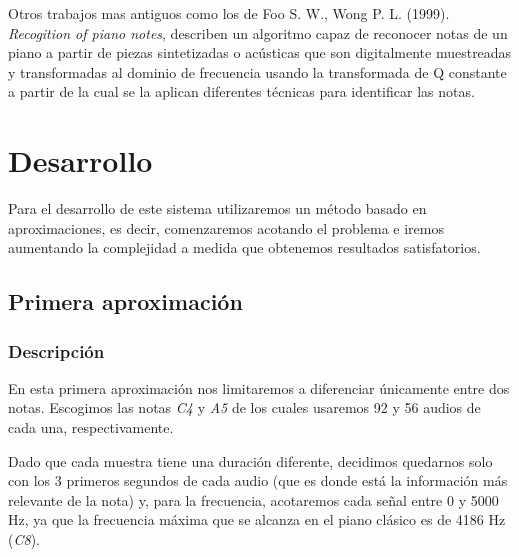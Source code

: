 \documentclass[12pt]{article}
\begin{document}
\bigskip
Otros trabajos mas antiguos como los de Foo S. W., Wong P. L. (1999). \textit{Recogition of piano notes}, describen un algoritmo capaz de reconocer notas
de un piano a partir de piezas sintetizadas o acústicas que son digitalmente muestreadas y transformadas al dominio de frecuencia usando 
la transformada de Q constante a partir de la cual se la aplican diferentes técnicas para identificar las notas.

\newpage
\section{Desarrollo}
\label{Desarrollo}
Para el desarrollo de este sistema utilizaremos un método basado en aproximaciones, es decir, comenzaremos acotando el problema e iremos aumentando
la complejidad a medida que obtenemos resultados satisfatorios.
\subsection{Primera aproximación}
\label{Primera aproximación}

\subsubsection{Descripción}
En esta primera aproximación nos limitaremos a diferenciar únicamente entre dos notas. 
Escogimos las notas \textit{C4} y \textit{A5} de los cuales usaremos 92 y 56 audios de cada una, respectivamente.

\bigskip
Dado que cada muestra tiene una duración diferente, decidimos quedarnos solo con los 3 primeros segundos de cada audio (que es donde está la información más
relevante de la nota) y, para la frecuencia, acotaremos cada señal entre 0 y 5000 Hz, ya que la frecuencia máxima que se alcanza en el piano clásico es de 4186 Hz (\textit{C8}).
\end{document}
